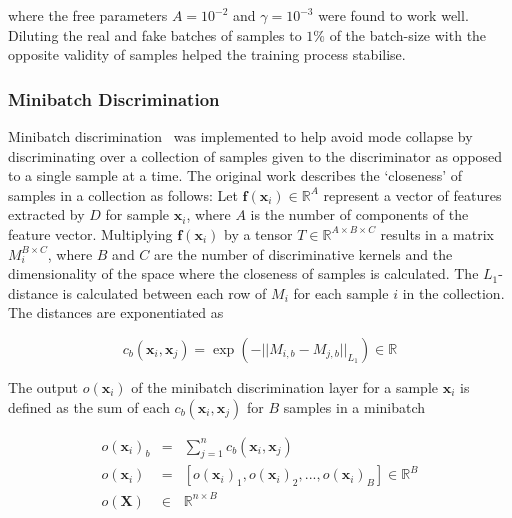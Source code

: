 \documentclass[twocolumn]{article}
\numberwithin{equation}{section}
\begin{document}
where the free parameters $A=10^{-2}$ and $\gamma=10^{-3}$ were found to work well. Diluting the real and fake batches of 
samples to $1\%$ of the batch-size with the opposite validity of samples helped the training process stabilise.


\subsubsection{Minibatch Discrimination}

Minibatch discrimination~\cite{gantricks_sali} was implemented to help avoid mode collapse by discriminating over a 
collection of samples given to the discriminator as opposed to a single sample at a time. The original work describes 
the `closeness' of samples in a collection as follows: Let $\mathbf{f}(\bm{x}_i) \in \mathbb{R}^A$ represent a vector of 
features extracted by $D$ for sample $\mathbf{x}_i$, where $A$ is the number of components of the feature vector. Multiplying $\mathbf{f}(\bm{x}_i)$ by a tensor $T \in \mathbb{R}^{A\times B\times C}$ results in a matrix $M_i^{B\times C}$, where $B$ 
and $C$ are the number of discriminative kernels and the dimensionality of the space where the closeness of samples is 
calculated. The $L_1$-distance is calculated between each row of $M_i$ for each sample $i$ in the collection. The distances 
are exponentiated as

\begin{equation}
    c_b(\mathbf{x}_i, \mathbf{x}_j) = \exp({- ||M_{i,b} - M_{j,b}||_{L_1}}) \in \mathbb{R} \nonumber
\end{equation}

The output $o(\mathbf{x}_i)$ of the minibatch discrimination layer for a sample $\mathbf{x}_i$ is defined as the sum of 
each $c_b(\mathbf{x}_i, \mathbf{x}_j)$ for $B$ samples in a minibatch

\begin{eqnarray}
    o(\mathbf{x}_i)_b &=& \sum_{j=1}^n c_b(\mathbf{x}_i, \mathbf{x}_j) \nonumber \\
    o(\mathbf{x}_i) &=& [o(\mathbf{x}_i)_1, o(\mathbf{x}_i)_2, ..., o(\mathbf{x}_i)_B] \in \mathbb{R}^B \nonumber\\
    o(\mathbf{X}) &\in& \mathbb{R}^{n \times B} \nonumber
\end{eqnarray}
\end{document}
